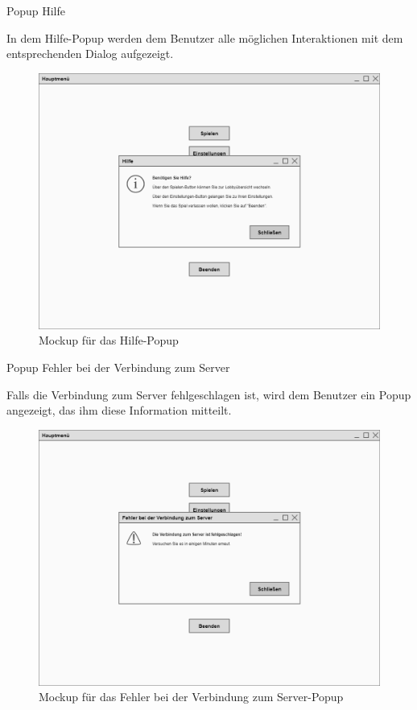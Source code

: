 Popup \glqq{}Hilfe\grqq{}

In dem Hilfe-Popup werden dem Benutzer alle möglichen Interaktionen mit dem entsprechenden Dialog aufgezeigt.

\begin{figure}
  \centering
  \includegraphics[width=\textwidth]{Meilenstein03/Hilfe_Mockup.png}
  \caption{Mockup für das Hilfe-Popup}
\end{figure}

Popup \glqq{}Fehler bei der Verbindung zum Server\grqq{}

Falls die Verbindung zum Server fehlgeschlagen ist, wird dem Benutzer ein Popup angezeigt, das ihm diese Information mitteilt.

\begin{figure}
  \centering
  \includegraphics[width=\textwidth]{Meilenstein03/FehlerBeiDerVerbindungZumServer_Mockup.png}
  \caption{Mockup für das Fehler bei der Verbindung zum Server-Popup}
\end{figure}

